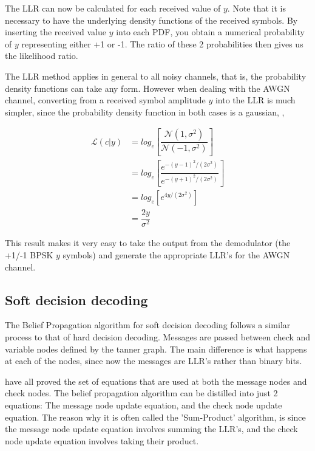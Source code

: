 \documentclass[11pt]{article}
\numberwithin{equation}{subsection}
\begin{document}
\noindent The LLR can now be calculated for each received value of $y$. Note that it is necessary to have the underlying density functions of the received symbols. By inserting the received value $y$ into each PDF, you obtain a numerical probability of $y$ representing either +1 or -1. The ratio of these 2 probabilities then gives us the likelihood ratio.

The LLR method applies in general to all noisy channels, that is, the probability density functions can take any form. However when dealing with the AWGN channel, converting from a received symbol amplitude $y$ into the LLR is much simpler, since the probability density function in both cases is a gaussian, \cite{cho2012analysis},

\begin{equation} \label{eq:LLR_awgn}
\begin{aligned}
\mathcal{L}(c|y) &= log_e \left[ \dfrac{\mathcal{N}(1,\sigma^2)} {\mathcal{N}(-1,\sigma^2)} \right] 
\\
&= log_e \left[ \dfrac{e^{-(y-1)^2/(2\sigma^2)}}{e^{-(y+1)^2/(2\sigma^2)}} \right]
\\
&= log_e \left[ e^{4y/(2\sigma^2)} \right]
\\
&= \dfrac{2y}{\sigma^2}
\end{aligned}
\end{equation}

\noindent This result makes it very easy to take the output from the demodulator (the +1/-1 BPSK $y$ symbols) and generate the appropriate LLR's for the AWGN channel.

\subsection{Soft decision decoding}
The Belief Propagation algorithm for soft decision decoding follows a similar process to that of hard decision decoding. Messages are passed between check and variable nodes defined by the tanner graph. The main difference is what happens at each of the nodes, since now the messages are LLR's rather than binary bits. 

\cite{ldpc-tutorial1,mncisit,gallager1962low} have all proved the set of equations that are used at both the message nodes and check nodes. The belief propagation algorithm can be distilled into just 2 equations: The message node update equation, and the check node update equation. The reason why it is often called the 'Sum-Product' algorithm, is since the message node update equation involves summing the LLR's, and the check node update equation involves taking their product.
\end{document}
